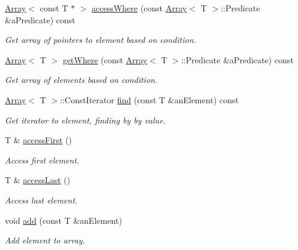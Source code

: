 \begin{DoxyCompactItemize}
\hyperlink{classlibrary_1_1core_1_1ctnr_1_1_array}{Array}$<$ const T $\ast$ $>$ \hyperlink{classlibrary_1_1core_1_1ctnr_1_1_array_a5359c59d344a6147c7c6ea1012411011}{access\+Where} (const \hyperlink{classlibrary_1_1core_1_1ctnr_1_1_array}{Array}$<$ T $>$\+::Predicate \&a\+Predicate) const
\begin{DoxyCompactList}\small\item\em Get array of pointers to element based on condition. \end{DoxyCompactList}\item 
\hyperlink{classlibrary_1_1core_1_1ctnr_1_1_array}{Array}$<$ T $>$ \hyperlink{classlibrary_1_1core_1_1ctnr_1_1_array_a62069b24d593b2265422cb8f3a149c44}{get\+Where} (const \hyperlink{classlibrary_1_1core_1_1ctnr_1_1_array}{Array}$<$ T $>$\+::Predicate \&a\+Predicate) const
\begin{DoxyCompactList}\small\item\em Get array of elements based on condition. \end{DoxyCompactList}\item 
\hyperlink{classlibrary_1_1core_1_1ctnr_1_1_array}{Array}$<$ T $>$\+::Const\+Iterator \hyperlink{classlibrary_1_1core_1_1ctnr_1_1_array_aeb8ed38b67b6031e27c188d89bd5cbbf}{find} (const T \&an\+Element) const
\begin{DoxyCompactList}\small\item\em Get iterator to element, finding by by value. \end{DoxyCompactList}\item 
T \& \hyperlink{classlibrary_1_1core_1_1ctnr_1_1_array_abb2068e46720e8df057b5410ac8879d5}{access\+First} ()
\begin{DoxyCompactList}\small\item\em Access first element. \end{DoxyCompactList}\item 
T \& \hyperlink{classlibrary_1_1core_1_1ctnr_1_1_array_ad6ea47ab09dfeebd6de0878d3ad2de25}{access\+Last} ()
\begin{DoxyCompactList}\small\item\em Access last element. \end{DoxyCompactList}\item 
void \hyperlink{classlibrary_1_1core_1_1ctnr_1_1_array_a388497f6bda07f69d61aa60099b991a8}{add} (const T \&an\+Element)
\begin{DoxyCompactList}\small\item\em Add element to array. \end{DoxyCompactList}\item 

\end{DoxyCompactItemize}
